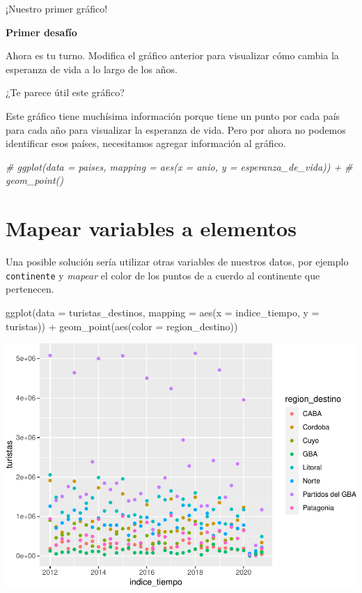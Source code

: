 \documentclass[
  openany]{book}
\newenvironment{Shaded}{\begin{snugshade}}{\end{snugshade}}
\newcommand{\AttributeTok}[1]{\textcolor[rgb]{0.77,0.63,0.00}{#1}}
\newcommand{\CommentTok}[1]{\textcolor[rgb]{0.56,0.35,0.01}{\textit{#1}}}
\newcommand{\FunctionTok}[1]{\textcolor[rgb]{0.00,0.00,0.00}{#1}}
\newcommand{\NormalTok}[1]{#1}
\newcommand{\SpecialCharTok}[1]{\textcolor[rgb]{0.00,0.00,0.00}{#1}}
\begin{document}
¡Nuestro primer gráfico!

\textbf{Primer desafío}

Ahora es tu turno.
Modifica el gráfico anterior para visualizar cómo cambia la esperanza de vida a lo largo de los años.

¿Te parece útil este gráfico?

Este gráfico tiene muchísima información porque tiene un punto por cada país para cada año para visualizar la esperanza de vida.
Pero por ahora no podemos identificar esos países, necesitamos agregar información al gráfico.

\begin{Shaded}
\begin{Highlighting}[]
\CommentTok{\# ggplot(data = paises, mapping = aes(x = anio, y = esperanza\_de\_vida)) +}
\CommentTok{\#   geom\_point()}
\end{Highlighting}
\end{Shaded}

\hypertarget{mapear-variables-a-elementos}{%
\section{Mapear variables a elementos}\label{mapear-variables-a-elementos}}

Una posible solución sería utilizar otras variables de nuestros datos, por ejemplo \texttt{continente} y \emph{mapear} el color de los puntos de a cuerdo al continente que pertenecen.

\begin{Shaded}
\begin{Highlighting}[]
\FunctionTok{ggplot}\NormalTok{(}\AttributeTok{data =}\NormalTok{ turistas\_destinos, }\AttributeTok{mapping =} \FunctionTok{aes}\NormalTok{(}\AttributeTok{x =}\NormalTok{ indice\_tiempo, }\AttributeTok{y =}\NormalTok{ turistas)) }\SpecialCharTok{+}
  \FunctionTok{geom\_point}\NormalTok{(}\FunctionTok{aes}\NormalTok{(}\AttributeTok{color =}\NormalTok{ region\_destino))}
\end{Highlighting}
\end{Shaded}

\begin{center}\includegraphics[width=1\linewidth]{DT6_files/figure-latex/unnamed-chunk-50-1} \end{center}
\end{document}
